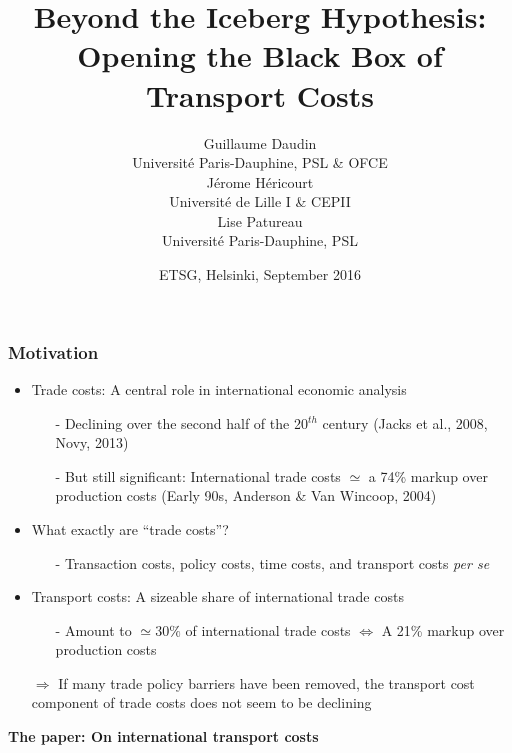 \documentclass[10 pt,Helvetica, french]{beamer}
\date[September 2016]{ETSG, Helsinki, September 2016}
\title[Trade Costs Black Box]{Beyond the Iceberg Hypothesis: \\Opening the Black Box of Transport Costs}
\author[Daudin et al.]{Guillaume Daudin\\
{\footnotesize Universit\'{e} Paris-Dauphine, PSL \& OFCE }\\ \smallskip
J\'{e}rome H\'{e}ricourt \\
{\footnotesize Universit\'{e} de Lille I \& CEPII }\\  \smallskip
Lise Patureau \\
{\footnotesize  Universit\'{e} Paris-Dauphine, PSL}}
\begin{document}
\begin{frame}[plain]
\titlepage
\end{frame}


\begin{frame}
\frametitle{Motivation}
\begin{itemize}
\item Trade costs: A central role in international economic analysis \vspace{0.1cm}
\begin{itemize}
\item[-] Declining over the second half of the 20$^{th}$ century (Jacks et al., 2008, Novy, 2013) \vspace{0.1cm}
\item[-] But still significant: International trade costs $\simeq$ a 74\% markup over production costs (Early 90s, Anderson \& Van Wincoop, 2004) \vspace{0.1cm}
\end{itemize}
\item What exactly are ``trade costs''?  \vspace{0.1cm}
\begin{itemize}
\item[-] Transaction costs, policy costs, time costs, and transport costs \textit{per se}
\end{itemize}
\item Transport costs: A sizeable share of international trade costs \vspace{0.1cm}
\begin{itemize}
\item[-] Amount to $\simeq 30\%$ of international trade costs  $\Leftrightarrow$ A 21\% markup over production costs  \vspace{0.1cm}
\end{itemize}
\item[$\Rightarrow$] If many trade policy barriers have been removed, the transport cost component of trade costs does not seem to be declining\vspace{0.1cm}
\end{itemize}
\textbf{The paper: On international transport costs}

\end{frame}
\end{document}
